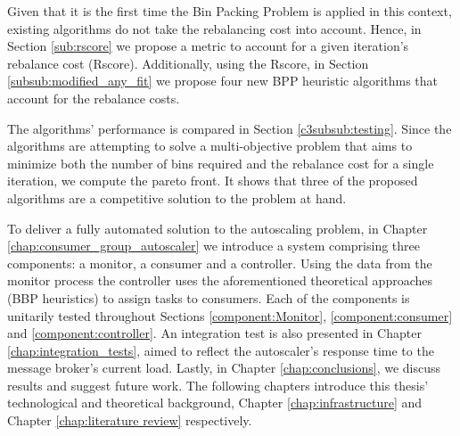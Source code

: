 Given that it is the first time the Bin Packing Problem is applied in this
context, existing algorithms do not take the rebalancing cost into account.
Hence, in Section \ref{sub:rscore} we propose a metric to account for a given
iteration's rebalance cost (Rscore). Additionally, using the Rscore, in Section
\ref{subsub:modified_any_fit} we propose four new BPP heuristic algorithms that
account for the rebalance costs.

The algorithms' performance is compared in Section \ref{c3subsub:testing}. Since
the algorithms are attempting to solve a multi-objective problem that aims to
minimize both the number of bins required and the rebalance cost for a single
iteration, we compute the pareto front. It shows that three of the proposed
algorithms are a competitive solution to the problem at hand.

To deliver a fully automated solution to the autoscaling problem, in Chapter
\ref{chap:consumer_group_autoscaler} we introduce a system comprising three
components: a monitor, a consumer and a controller. Using the data from the
monitor process the controller uses the aforementioned theoretical approaches
(BBP heuristics) to assign tasks to consumers. Each of the components is
unitarily tested throughout Sections \ref{component:Monitor},
\ref{component:consumer} and \ref{component:controller}. An integration test is
also presented in Chapter \ref{chap:integration_tests}, aimed to reflect the
autoscaler's response time to the message broker's current load. Lastly, in
Chapter \ref{chap:conclusions}, we discuss results and suggest future work.
The following chapters introduce this thesis' technological and theoretical
background, Chapter \ref{chap:infrastructure} and Chapter \ref{chap:literature
review} respectively.


